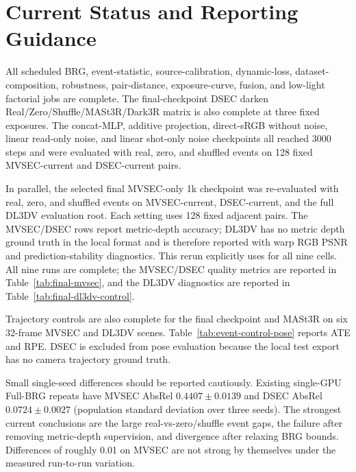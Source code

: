 \documentclass[10pt]{article}
\begin{document}
\section{Current Status and Reporting Guidance}

All scheduled BRG, event-statistic, source-calibration, dynamic-loss,
dataset-composition, robustness, pair-distance, exposure-curve, fusion, and
low-light factorial jobs are complete.  The final-checkpoint DSEC darken
Real/Zero/Shuffle/MASt3R/Dark3R matrix is also complete at three fixed
exposures.  The
concat-MLP, additive projection,
direct-sRGB without noise, linear read-only noise, and linear shot-only noise
checkpoints all reached 3000 steps and were evaluated with real, zero, and
shuffled events on 128 fixed MVSEC-current and DSEC-current pairs.

In parallel, the selected final MVSEC-only 1k checkpoint was re-evaluated
with real, zero, and shuffled events on MVSEC-current, DSEC-current, and the
full DL3DV evaluation root.  Each setting uses 128 fixed adjacent pairs.  The
MVSEC/DSEC rows report metric-depth accuracy; DL3DV has no metric depth ground
truth in the local format and is therefore reported with warp RGB PSNR and
prediction-stability diagnostics.  This rerun explicitly uses
 for
all nine cells.  All nine runs are complete; the MVSEC/DSEC quality metrics are
reported in Table~\ref{tab:final-mvsec}, and the DL3DV diagnostics are reported
in Table~\ref{tab:final-dl3dv-control}.

Trajectory controls are also complete for the final checkpoint and MASt3R on
six 32-frame MVSEC and DL3DV scenes.  Table~\ref{tab:event-control-pose} reports
ATE and RPE.  DSEC is excluded from pose evaluation because the local test
export has no camera trajectory ground truth.

Small single-seed differences should be reported cautiously.  Existing
single-GPU Full-BRG repeats have MVSEC AbsRel $0.4407\pm0.0139$ and DSEC AbsRel
$0.0724\pm0.0027$ (population standard deviation over three seeds).  The
strongest current conclusions are the large real-vs-zero/shuffle event gaps,
the failure after removing metric-depth supervision, and divergence after
relaxing BRG bounds.  Differences of roughly 0.01 on MVSEC are not strong by
themselves under the measured run-to-run variation.
\end{document}
